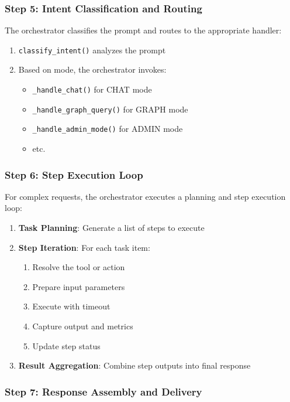 \documentclass[a4paper,twoside]{sapthesis}
\begin{document}
\subsubsection{Step 5: Intent Classification and Routing}

The orchestrator classifies the prompt and routes to the appropriate handler:

\begin{enumerate}
    \item \texttt{classify\_intent()} analyzes the prompt
    \item Based on mode, the orchestrator invokes:
    \begin{itemize}
        \item \texttt{\_handle\_chat()} for CHAT mode
        \item \texttt{\_handle\_graph\_query()} for GRAPH mode
        \item \texttt{\_handle\_admin\_mode()} for ADMIN mode
        \item etc.
    \end{itemize}
\end{enumerate}

\subsubsection{Step 6: Step Execution Loop}

For complex requests, the orchestrator executes a planning and step execution loop:

\begin{enumerate}
    \item \textbf{Task Planning}: Generate a list of steps to execute
    \item \textbf{Step Iteration}: For each task item:
    \begin{enumerate}
        \item Resolve the tool or action
        \item Prepare input parameters
        \item Execute with timeout
        \item Capture output and metrics
        \item Update step status
    \end{enumerate}
    \item \textbf{Result Aggregation}: Combine step outputs into final response
\end{enumerate}

\subsubsection{Step 7: Response Assembly and Delivery}
\end{document}
